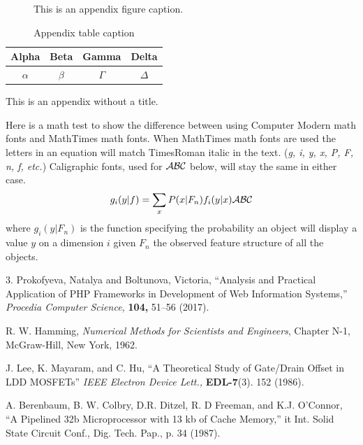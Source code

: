\documentclass{wileySix}
\begin{document}
\begin{figure}[ht]
\caption{This is an appendix figure caption.}
\end{figure}


\begin{table}[ht]
\caption{Appendix table caption}
\centering
\begin{tabular}{cccc}
\hline
Alpha&Beta&Gamma&Delta\\
\hline
$\alpha$&$\beta$&$\Gamma$&$\Delta$\\
\hline
\end{tabular}
\end{table}


\appendix{}
This is an appendix without a title.

Here is a math test to show the difference between using Computer Modern
math fonts and MathTimes math fonts. When MathTimes math fonts are used
the letters in an equation will match TimesRoman italic in the text.
({\it g, i, y, x, P, F, n, f, etc.}) Caligraphic fonts, used for
$\cal ABC$ below, will stay the same
in either case.
\begin{equation}
g_i(y|f)=\sum_x P(x|F_n)f_i(y|x){\cal ABC}
\end{equation}
where $g_i(y|F_n)$ is the function specifying the probability an object will
display a value $y$ on a dimension $i$ given $F_n$ the observed feature
structure of all the objects.



\begin{references}{3.}
Prokofyeva, Natalya and Boltunova, Victoria,
``Analysis and Practical Application of PHP Frameworks in Development of Web Information Systems,'' {\it Procedia Computer Science,}
{\bf 104,} 51--56 (2017).

R. W. Hamming,
                 {\it Numerical Methods for Scientists and
                 Engineers}, Chapter N-1, McGraw-Hill,
                 New York, 1962.

J. Lee, K. Mayaram, and C. Hu, ``A Theoretical
               Study of Gate/Drain Offset in LDD MOSFETs''
                     {\it IEEE Electron Device Lett.,} {\bf EDL-7}(3). 152
                     (1986).

A. Berenbaum,
B. W. Colbry, D.R. Ditzel, R. D Freeman, and
K.J. O'Connor, ``A Pipelined 32b Microprocessor with 13 kb of Cache Memory,''
{it Int. Solid State Circuit Conf., Dig. Tech. Pap.,} p. 34 (1987).
\end{references}
\end{document}
